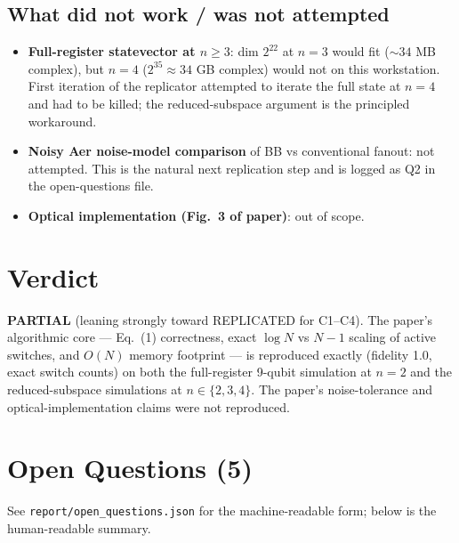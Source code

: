 \documentclass[11pt]{article}
\begin{document}
\subsection{What did not work / was not attempted}
\begin{itemize}
  \item \textbf{Full-register statevector at $n\ge 3$}: dim $2^{22}$ at $n{=}3$
    would fit ($\sim 34$ MB complex), but $n{=}4$ ($2^{35} \approx 34$ GB
    complex) would not on this workstation. First iteration of the replicator
    attempted to iterate the full state at $n{=}4$ and had to be killed; the
    reduced-subspace argument is the principled workaround.
  \item \textbf{Noisy Aer noise-model comparison} of BB vs conventional
    fanout: not attempted. This is the natural next replication step and is
    logged as Q2 in the open-questions file.
  \item \textbf{Optical implementation (Fig.~3 of paper)}: out of scope.
\end{itemize}

\section{Verdict}
\textbf{PARTIAL} (leaning strongly toward REPLICATED for C1--C4). The paper's
algorithmic core --- Eq.~(1) correctness, exact $\log N$ vs $N-1$ scaling of
active switches, and $O(N)$ memory footprint --- is reproduced exactly (fidelity
1.0, exact switch counts) on both the full-register 9-qubit simulation at
$n{=}2$ and the reduced-subspace simulations at $n\in\{2,3,4\}$. The paper's
noise-tolerance and optical-implementation claims were not reproduced.

\section*{Open Questions (5)}
See \texttt{report/open\_questions.json} for the machine-readable form; below
is the human-readable summary.
\end{document}
